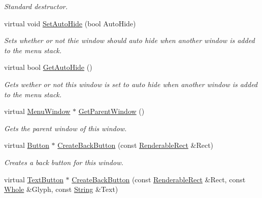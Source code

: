 \begin{DoxyCompactItemize}
\begin{DoxyCompactList}\small\item\em Standard destructor. \item\end{DoxyCompactList}\item 
virtual void \hyperlink{classphys_1_1UI_1_1MenuWindow_ac531ecb7994c9f7718a36f57c85db1b1}{SetAutoHide} (bool AutoHide)
\begin{DoxyCompactList}\small\item\em Sets whether or not thie window should auto hide when another window is added to the menu stack. \item\end{DoxyCompactList}\item 
virtual bool \hyperlink{classphys_1_1UI_1_1MenuWindow_ab7210297e9bf76bea6e0e610ab266eed}{GetAutoHide} ()
\begin{DoxyCompactList}\small\item\em Gets wether or not this window is set to auto hide when another window is added to the menu stack. \item\end{DoxyCompactList}\item 
virtual \hyperlink{classphys_1_1UI_1_1MenuWindow}{MenuWindow} $\ast$ \hyperlink{classphys_1_1UI_1_1MenuWindow_ac47ccc564f09ac33e13e56860b6ae281}{GetParentWindow} ()
\begin{DoxyCompactList}\small\item\em Gets the parent window of this window. \item\end{DoxyCompactList}\item 
virtual \hyperlink{classphys_1_1UI_1_1Button}{Button} $\ast$ \hyperlink{classphys_1_1UI_1_1MenuWindow_a450627ceff35e1454204f3dfe6bbb891}{CreateBackButton} (const \hyperlink{structphys_1_1UI_1_1RenderableRect}{RenderableRect} \&Rect)
\begin{DoxyCompactList}\small\item\em Creates a back button for this window. \item\end{DoxyCompactList}\item 
virtual \hyperlink{classphys_1_1UI_1_1TextButton}{TextButton} $\ast$ \hyperlink{classphys_1_1UI_1_1MenuWindow_a45c9524dc77b6436fcc12a52201442e3}{CreateBackButton} (const \hyperlink{structphys_1_1UI_1_1RenderableRect}{RenderableRect} \&Rect, const \hyperlink{namespacephys_a460f6bc24c8dd347b05e0366ae34f34a}{Whole} \&Glyph, const \hyperlink{namespacephys_aa03900411993de7fbfec4789bc1d392e}{String} \&Text)

\end{DoxyCompactItemize}
